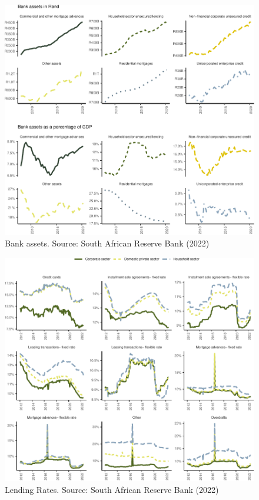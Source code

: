 \documentclass[
]{article}
\begin{document}
\begin{figure}[H]

\includegraphics{Bank_capital_and_bank_lending_files/figure-latex/unnamed-chunk-5-1} \hfill{}

\caption{Bank assets. Source: South African Reserve Bank (2022)}\label{fig:unnamed-chunk-5}
\end{figure}

\begin{figure}[H]

\includegraphics{Bank_capital_and_bank_lending_files/figure-latex/unnamed-chunk-6-1} \hfill{}

\caption{Lending Rates. Source: South African Reserve Bank (2022)}\label{fig:unnamed-chunk-6}
\end{figure}
\end{document}
